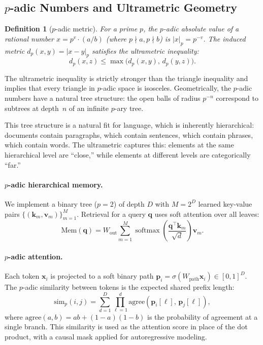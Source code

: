 \documentclass[11pt,a4paper]{article}
\newtheorem{definition}[theorem]{Definition}
\DeclareMathOperator{\softmax}{softmax}
\begin{document}
\subsection{$p$-adic Numbers and Ultrametric Geometry}
\label{sec:padic}

\begin{definition}[$p$-adic metric]
For a prime $p$, the $p$-adic absolute value of a rational number
$x = p^v \cdot (a/b)$ (where $p \nmid a, p \nmid b$) is
$|x|_p = p^{-v}$.  The induced metric $d_p(x,y) = |x-y|_p$ satisfies
the \emph{ultrametric inequality}:
\begin{equation}
d_p(x, z) \leq \max\bigl(d_p(x, y),\, d_p(y, z)\bigr).
\label{eq:ultrametric}
\end{equation}
\end{definition}

The ultrametric inequality is strictly stronger than the triangle
inequality and implies that every triangle in $p$-adic space is
isosceles.  Geometrically, the $p$-adic numbers have a natural tree
structure: the open balls of radius $p^{-n}$ correspond to subtrees
at depth~$n$ of an infinite $p$-ary tree.

This tree structure is a natural fit for language, which is inherently
hierarchical: documents contain paragraphs, which contain sentences,
which contain phrases, which contain words.  The ultrametric captures
this: elements at the same hierarchical level are ``close,'' while
elements at different levels are categorically ``far.''

\paragraph{$p$-adic hierarchical memory.}
We implement a binary tree ($p=2$) of depth $D$ with $M = 2^D$
learned key-value pairs $\{(\bm{k}_m, \bm{v}_m)\}_{m=1}^{M}$.
Retrieval for a query $\bm{q}$ uses soft attention over all leaves:
\begin{equation}
\text{Mem}(\bm{q}) = W_{\text{out}} \sum_{m=1}^{M}
  \softmax\!\left(\frac{\bm{q}^\top \bm{k}_m}{\sqrt{d}}\right) \bm{v}_m.
\label{eq:padic_mem}
\end{equation}

\paragraph{$p$-adic attention.}
Each token $\bm{x}_i$ is projected to a soft binary path
$\bm{p}_i = \sigma(W_{\text{path}} \bm{x}_i) \in [0,1]^D$.
The $p$-adic similarity between tokens is the expected shared prefix
length:
\begin{equation}
\text{sim}_{p}(i, j) = \sum_{d=1}^{D} \prod_{\ell=1}^{d}
  \text{agree}(\bm{p}_{i}[\ell],\, \bm{p}_{j}[\ell]),
\label{eq:padic_sim}
\end{equation}
where $\text{agree}(a, b) = ab + (1-a)(1-b)$ is the probability of
agreement at a single branch.  This similarity is used as the
attention score in place of the dot product, with a causal mask
applied for autoregressive modeling.
\end{document}
